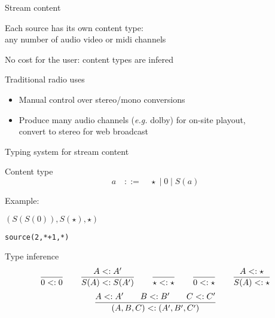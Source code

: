 \documentclass{beamer}
\newcommand{\sub}{<:}
\newcommand{\infer}[2]{{#2 \over #1}}
\renewcommand{\textbf}[1]{{\color{blue} #1}}
\begin{document}
\begin{frame}{Stream content}

\begin{center}
\large
  Each source has its own content type: \\
  any number of \textbf{audio video or midi} channels
\begin{flushright}
\small No cost for the user: content types are infered
\end{flushright}
\end{center}

\begin{block}{Traditional radio uses}
\begin{itemize}
\item Manual control over stereo/mono conversions
\item<4-> Produce many audio channels ({\em e.g.} dolby) for on-site playout, \\
  convert to stereo for web broadcast
\end{itemize}
\end{block}
\end{frame}

\begin{frame}[fragile]{Typing system for stream content}

Content type
\[
a\quad ::=\quad \star \;|\; 0 \;|\; S(a)
\]

Example:
\begin{center}
$(S(S(0)),S(\star),\star)$\\\medskip 
{}
\begin{large}\texttt{source(2,*+1,*)}\end{large}
\end{center}

Type inference
   \[\infer{0\sub 0}{} \quad\quad
   \infer{S(A)\sub S(A')}{A\sub A'} \quad\quad
   \infer{\star\sub\star}{} \quad\quad
   \infer{0\sub \star}{} \quad\quad
   \infer{S(A)\sub \star}{A\sub\star}
\]
\[
   \infer{(A,B,C) \sub (A',B',C')}{A \sub A' \quad\quad B\sub B' \quad\quad C\sub C'}
\]

\end{frame}
\end{document}
